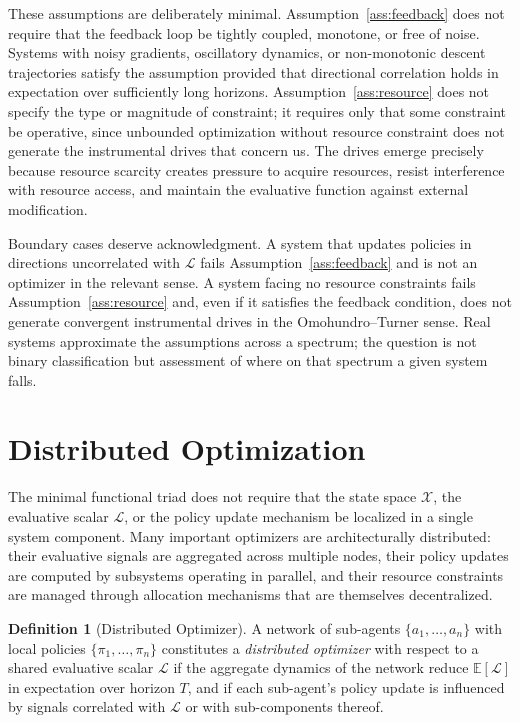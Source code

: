 \documentclass[12pt, oneside]{book}
\theoremstyle{plain}
\theoremstyle{definition}
\newtheorem{definition}[theorem]{Definition}
\theoremstyle{remark}
\theoremstyle{definition}
\begin{document}
These assumptions are deliberately minimal. Assumption~\ref{ass:feedback} does not
require that the feedback loop be tightly coupled, monotone, or free of noise.
Systems with noisy gradients, oscillatory dynamics, or non-monotonic descent
trajectories satisfy the assumption provided that directional correlation holds in
expectation over sufficiently long horizons. Assumption~\ref{ass:resource} does not
specify the type or magnitude of constraint; it requires only that some constraint
be operative, since unbounded optimization without resource constraint does not
generate the instrumental drives that concern us. The drives emerge precisely because
resource scarcity creates pressure to acquire resources, resist interference with
resource access, and maintain the evaluative function against external modification.

Boundary cases deserve acknowledgment. A system that updates policies in directions
uncorrelated with $\mathcal{L}$ fails Assumption~\ref{ass:feedback} and is not an
optimizer in the relevant sense. A system facing no resource constraints fails
Assumption~\ref{ass:resource} and, even if it satisfies the feedback condition, does
not generate convergent instrumental drives in the Omohundro--Turner sense. Real
systems approximate the assumptions across a spectrum; the question is not binary
classification but assessment of where on that spectrum a given system falls.

\section{Distributed Optimization}

The minimal functional triad does not require that the state space $\mathcal{X}$, the
evaluative scalar $\mathcal{L}$, or the policy update mechanism be localized in a
single system component. Many important optimizers are architecturally distributed:
their evaluative signals are aggregated across multiple nodes, their policy updates
are computed by subsystems operating in parallel, and their resource constraints are
managed through allocation mechanisms that are themselves decentralized.

\begin{definition}[Distributed Optimizer]
\label{def:distributed}
A network of sub-agents $\{a_1, \ldots, a_n\}$ with local policies $\{\pi_1, \ldots,
\pi_n\}$ constitutes a \emph{distributed optimizer} with respect to a shared
evaluative scalar $\mathcal{L}$ if the aggregate dynamics of the network reduce
$\mathbb{E}[\mathcal{L}]$ in expectation over horizon $T$, and if each sub-agent's
policy update is influenced by signals correlated with $\mathcal{L}$ or with
sub-components thereof.
\end{definition}
\end{document}
